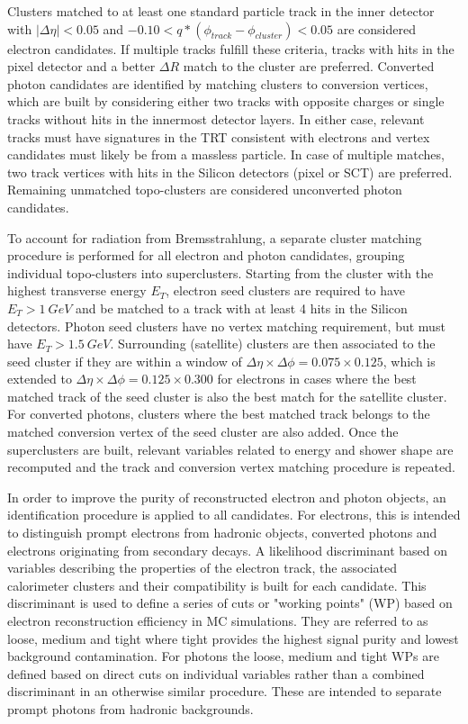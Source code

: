 Clusters matched to at least one standard particle track in the inner detector with 
$|\Delta\eta| < 0.05$ and $-0.10 < q*(\phi_{track}-\phi_{cluster}) < 0.05$ are considered electron candidates. If 
multiple tracks fulfill these criteria, tracks with hits in the pixel detector and a better $\Delta R$ match to the 
cluster are preferred. Converted photon candidates are identified by matching clusters to conversion vertices, which 
are built by considering either two tracks with opposite charges or single tracks without hits in the innermost 
detector layers. In either case, relevant tracks must have signatures in the TRT consistent with electrons and vertex 
candidates must likely be from a massless particle. In case of multiple matches, two track vertices with hits in the 
Silicon detectors (pixel or SCT) are preferred. Remaining unmatched topo-clusters are considered unconverted photon 
candidates. \par

To account for radiation from Bremsstrahlung, a separate cluster matching procedure is performed for all electron and 
photon candidates, grouping individual topo-clusters into superclusters. Starting from the cluster with the highest 
transverse energy $E_T$, electron seed clusters are required to have $E_T > 1\ GeV$ and be matched to a track with 
at least 4 hits in the Silicon detectors. Photon seed clusters have no vertex matching requirement, but must have 
$E_T > 1.5\ GeV$. Surrounding (satellite) clusters are then associated to the seed cluster if they are within a window 
of $\Delta\eta\times\Delta\phi =0.075\times0.125$, which is extended to $\Delta\eta\times\Delta\phi =0.125\times0.300$ 
for electrons in cases where the best matched track of the seed cluster is also the best match for the satellite 
cluster. For converted photons, clusters where the best matched track belongs to the matched conversion vertex of the 
seed cluster are also added. Once the superclusters are built, relevant variables related to energy and shower shape 
are recomputed and the track and conversion vertex matching procedure is repeated. \par

In order to improve the purity of reconstructed electron and photon objects, an identification procedure is applied to 
all candidates. For electrons, this is intended to distinguish prompt electrons from hadronic objects, converted photons 
and electrons originating from secondary decays. A likelihood discriminant based on variables describing the properties 
of the electron track, the associated calorimeter clusters and their compatibility is built for each candidate. This 
discriminant is used to define a series of cuts or "working points" (WP) based on electron reconstruction efficiency 
in MC simulations. They are referred to as loose, medium and tight where tight provides the highest signal purity and 
lowest background contamination. For photons the loose, medium and tight WPs are defined based on direct cuts on 
individual variables rather than a combined discriminant in an otherwise similar procedure. These are intended to 
separate prompt photons from hadronic backgrounds. \par

